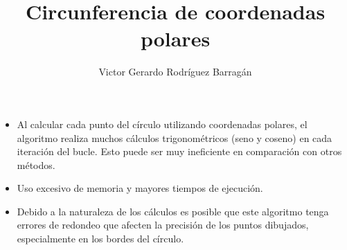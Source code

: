 \documentclass{article}
\title{Circunferencia de coordenadas polares}
\author{Victor Gerardo Rodríguez Barragán}
\date{}
\begin{document}
\maketitle
\justify

\begin{itemize}
\item
Al calcular cada punto del círculo utilizando coordenadas polares, el algoritmo realiza
muchos cálculos trigonométricos (seno y coseno) en cada iteración del bucle.
Esto puede ser muy ineficiente en comparación con otros métodos.
\item
Uso excesivo de memoria y mayores tiempos de ejecución.
\item
Debido a la naturaleza de los cálculos es posible que este algoritmo tenga errores de
redondeo que afecten la precisión de los puntos dibujados, especialmente en los bordes del círculo.
\end{itemize}
\end{document}
